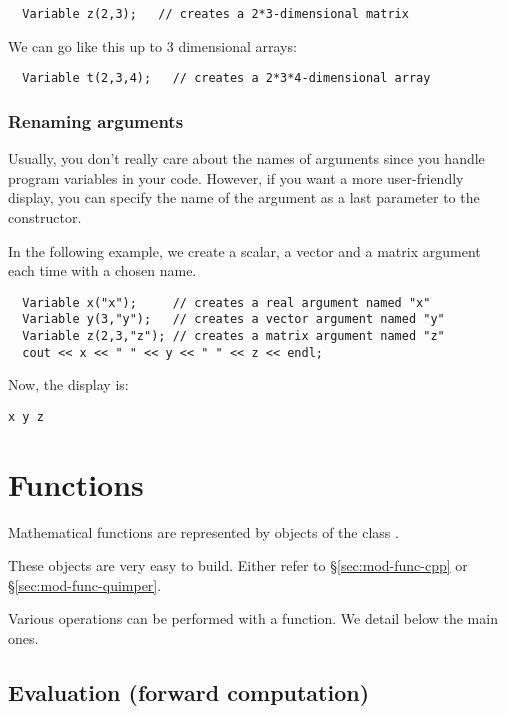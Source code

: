 \begin{lstlisting}
  Variable z(2,3);   // creates a 2*3-dimensional matrix
\end{lstlisting}

We can go like this up to 3 dimensional arrays:

\begin{lstlisting}
  Variable t(2,3,4);   // creates a 2*3*4-dimensional array
\end{lstlisting}


\subsubsection{Renaming arguments}\label{sec:mod-var-name}
Usually, you don't really care about the names of arguments since you handle
program variables in your code.
However, if you want a more user-friendly display, you can specify
the name of the argument as a last parameter to the constructor.

In the following example, we create a scalar, a vector and a matrix argument each
time with a chosen name.

\begin{lstlisting}
  Variable x("x");     // creates a real argument named "x"
  Variable y(3,"y");   // creates a vector argument named "y"
  Variable z(2,3,"z"); // creates a matrix argument named "z"
  cout << x << " " << y << " " << z << endl;
\end{lstlisting}

Now, the display is:
\begin{lstlisting}
x y z
\end{lstlisting}


\section{Functions}\label{sec:mod-func}

Mathematical functions are represented by objects of the class .

These objects are very easy to build. Either refer to \S\ref{sec:mod-func-cpp}
or \S\ref{sec:mod-func-quimper}.

Various operations can be performed with a function. We detail below the main ones.

\subsection{Evaluation (forward computation)}

